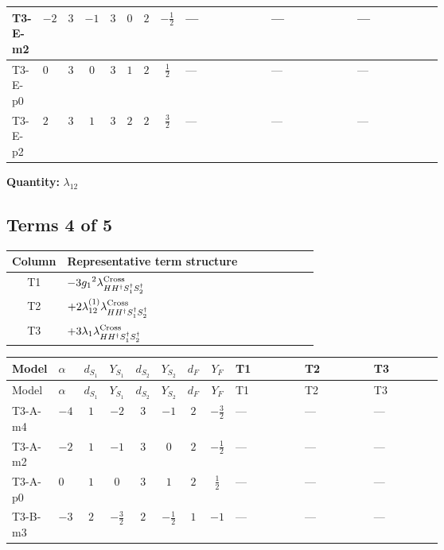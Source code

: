 \documentclass[8pt]{article}
\begin{document}
\begin{landscape}
\begin{longtable}{@{}llcccccc >{\raggedright\arraybackslash}p{0.21\linewidth} >{\raggedright\arraybackslash}p{0.21\linewidth} >{\raggedright\arraybackslash}p{0.21\linewidth}@{}}
\midrule
T3-E-m2 & $-2$ & $3$ & $-1$ & $3$ & $0$ & $2$ & $-\frac{1}{2}$ & --- & --- & --- \\
\midrule
T3-E-p0 & $0$ & $3$ & $0$ & $3$ & $1$ & $2$ & $\frac{1}{2}$ & --- & --- & --- \\
\midrule
T3-E-p2 & $2$ & $3$ & $1$ & $3$ & $2$ & $2$ & $\frac{3}{2}$ & --- & --- & --- \\
\midrule
\bottomrule
\end{longtable}
\clearpage
\noindent\textbf{Quantity: }$\lambda_{12}$\par\smallskip
\subsection*{Terms 4 of 5}
\begin{center}
\begin{tabular}{@{}c >{\raggedright\arraybackslash}p{0.82\linewidth}@{}}
\toprule
Column & Representative term structure \\
\midrule
T1 & \(\displaystyle -3 {g_1}^2 {\lambda_{H H^\dagger S_1^\dagger S_2^\dagger}^{\rm Cross}}\) \\
\midrule
T2 & \(\displaystyle +2 {\lambda_{12}^{(1)}} {\lambda_{H H^\dagger S_1^\dagger S_2^\dagger}^{\rm Cross}}\) \\
\midrule
T3 & \(\displaystyle +3 {\lambda_1} {\lambda_{H H^\dagger S_1^\dagger S_2^\dagger}^{\rm Cross}}\) \\
\midrule
\bottomrule
\end{tabular}
\end{center}
\smallskip
\tiny
\begin{longtable}{@{}llcccccc >{\raggedright\arraybackslash}p{0.21\linewidth} >{\raggedright\arraybackslash}p{0.21\linewidth} >{\raggedright\arraybackslash}p{0.21\linewidth}@{}}
\toprule
Model & $\alpha$ & $d_{S_1}$ & $Y_{S_1}$ & $d_{S_2}$ & $Y_{S_2}$ & $d_F$ & $Y_F$ & T1 & T2 & T3 \\
\midrule
\endfirsthead
\toprule
Model & $\alpha$ & $d_{S_1}$ & $Y_{S_1}$ & $d_{S_2}$ & $Y_{S_2}$ & $d_F$ & $Y_F$ & T1 & T2 & T3 \\
\midrule
\endhead
T3-A-m4 & $-4$ & $1$ & $-2$ & $3$ & $-1$ & $2$ & $-\frac{3}{2}$ & --- & --- & --- \\
\midrule
T3-A-m2 & $-2$ & $1$ & $-1$ & $3$ & $0$ & $2$ & $-\frac{1}{2}$ & --- & --- & --- \\
\midrule
T3-A-p0 & $0$ & $1$ & $0$ & $3$ & $1$ & $2$ & $\frac{1}{2}$ & --- & --- & --- \\
\midrule
T3-B-m3 & $-3$ & $2$ & $-\frac{3}{2}$ & $2$ & $-\frac{1}{2}$ & $1$ & $-1$ & --- & --- & --- \\

\end{longtable}
\end{landscape}
\end{document}
